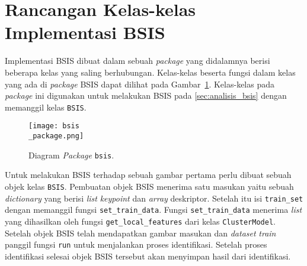 \section{Rancangan Kelas-kelas Implementasi BSIS}
\label{sec:rancangan_bsis}
Implementasi BSIS dibuat dalam sebuah \textit{package} yang didalamnya berisi beberapa kelas yang saling berhubungan. Kelas-kelas beserta fungsi dalam kelas yang ada di \textit{package} BSIS dapat dilihat pada Gambar~\ref{fig:bsis_package}. Kelas-kelas pada \textit{package} ini digunakan untuk melakukan BSIS pada \ref{sec:analisis_bsis} dengan memanggil kelas \texttt{BSIS}.
\begin{figure}[H]
	\centering
	\texttt{[image: bsis\\\_package.png]}
	\caption{Diagram \textit{Package} \texttt{bsis}.}
	\label{fig:bsis_package}
\end{figure}
Untuk melakukan BSIS terhadap sebuah gambar pertama perlu dibuat sebuah objek kelas \texttt{BSIS}. Pembuatan objek BSIS menerima satu masukan yaitu sebuah \textit{dictionary} yang berisi \textit{list} \textit{keypoint} dan \textit{array} deskriptor. Setelah itu isi \texttt{train\_set} dengan memanggil fungsi \texttt{set\_train\_data}. Fungsi \texttt{set\_train\_data} menerima \textit{list} yang dihasilkan oleh fungsi \texttt{get\_local\_features} dari kelas \texttt{ClusterModel}. Setelah objek BSIS telah mendapatkan gambar masukan dan \textit{dataset} \textit{train} panggil fungsi \texttt{run} untuk menjalankan proses identifikasi. Setelah proses identifikasi selesai objek BSIS tersebut akan menyimpan hasil dari identifikasi.

